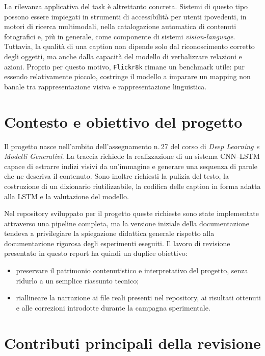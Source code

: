 \documentclass[11pt,a4paper]{report}
\newcommand{\dataset}{\texttt{Flickr8k}}
\begin{document}
La rilevanza applicativa del task è altrettanto concreta. Sistemi di questo tipo possono essere impiegati in strumenti di accessibilità per utenti ipovedenti, in motori di ricerca multimodali, nella catalogazione automatica di contenuti fotografici e, più in generale, come componente di sistemi \emph{vision-language}. Tuttavia, la qualità di una caption non dipende solo dal riconoscimento corretto degli oggetti, ma anche dalla capacità del modello di verbalizzare relazioni e azioni. Proprio per questo motivo, \dataset{} rimane un benchmark utile: pur essendo relativamente piccolo, costringe il modello a imparare un mapping non banale tra rappresentazione visiva e rappresentazione linguistica.

\section{Contesto e obiettivo del progetto}

Il progetto nasce nell'ambito dell'assegnamento n.\,27 del corso di \emph{Deep Learning e Modelli Generativi}. La traccia richiede la realizzazione di un sistema CNN--LSTM capace di estrarre indizi visivi da un'immagine e generare una sequenza di parole che ne descriva il contenuto. Sono inoltre richiesti la pulizia del testo, la costruzione di un dizionario riutilizzabile, la codifica delle caption in forma adatta alla LSTM e la valutazione del modello.

Nel repository sviluppato per il progetto queste richieste sono state implementate attraverso una pipeline completa, ma la versione iniziale della documentazione tendeva a privilegiare la spiegazione didattica generale rispetto alla documentazione rigorosa degli esperimenti eseguiti. Il lavoro di revisione presentato in questo report ha quindi un duplice obiettivo:
\begin{itemize}[leftmargin=*]
  \item preservare il patrimonio contenutistico e interpretativo del progetto, senza ridurlo a un semplice riassunto tecnico;
  \item riallineare la narrazione ai file reali presenti nel repository, ai risultati ottenuti e alle correzioni introdotte durante la campagna sperimentale.
\end{itemize}

\section{Contributi principali della revisione}
\end{document}
